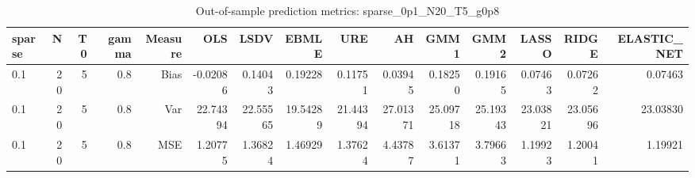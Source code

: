 \begin{table}[!htbp]\centering
\caption{Out-of-sample prediction metrics: sparse_0p1_N20_T5_g0p8}
\label{tab:table3_sparse_0p1_N20_T5_g0p8}
\begin{tabular}{lrrrrrrrrrrrrrr}
\hline
sparse & N & T0 & gamma & Measure & OLS & LSDV & EBMLE & URE & AH & GMM1 & GMM2 & LASSO & RIDGE & ELASTIC_NET \\
\hline
0.1 & 20 & 5 & 0.8 & Bias & -0.02086 & 0.14043 & 0.19228 & 0.11751 & 0.03945 & 0.18250 & 0.19165 & 0.07463 & 0.07262 & 0.07463 \\
0.1 & 20 & 5 & 0.8 & Var & 22.74394 & 22.55565 & 19.54289 & 21.44394 & 27.01371 & 25.09718 & 25.19343 & 23.03821 & 23.05696 & 23.03830 \\
0.1 & 20 & 5 & 0.8 & MSE & 1.20775 & 1.36824 & 1.46929 & 1.37624 & 4.43787 & 3.61371 & 3.79663 & 1.19923 & 1.20041 & 1.19921 \\
\hline
\end{tabular}
\end{table}

